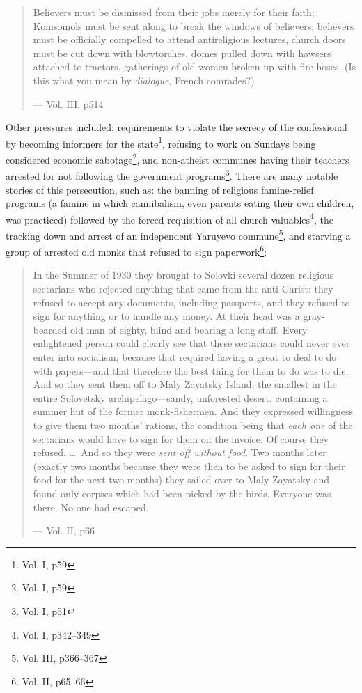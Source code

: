 \documentclass{article}
\begin{document}
\begin{quote}
Believers must be dismissed from their jobs merely for their faith; Komsomols must be sent along to break the windows of believers; believers must be officially compelled to attend antireligious lectures, church doors must be cut down with blowtorches, domes pulled down with hawsers attached to tractors, gatherings of old women broken up with fire hoses.  (Is this what you mean by \emph{dialogue}, French comrades?)

--- Vol. III, p514
\end{quote}

Other pressures included: requirements to violate the secrecy of the confessional by becoming informers for the state\footnote{Vol. I, p59}, refusing to work on Sundays being considered economic sabotage\footnote{Vol. I, p59}, and non-atheist communes having their teachers arrested for not following the government programs\footnote{Vol. I, p51}.  There are many notable stories of this persecution, such as: the banning of religious famine-relief programs (a famine in which cannibalism, even parents eating their own children, was practiced) followed by the forced requisition of all church valuables\footnote{Vol. I, p342--349}, the tracking down and arrest of an independent Yaruyevo commune\footnote{Vol. III, p366--367}, and starving a group of arrested old monks that refused to sign paperwork\footnote{Vol. II, p65--66}: 

\begin{quote}
In the Summer of 1930 they brought to Solovki several dozen religious sectarians who rejected anything that came from the anti-Christ: they refused to accept any documents, including passports, and they refused to sign for anything or to handle any money.  At their head was a gray-bearded old man of eighty, blind and bearing a long staff.  Every enlightened person could clearly see that these sectarians could never ever enter into socialism, because that required having a great to deal to do with papers---and that therefore the best thing for them to do was to die.  And so they sent them off to Maly Zayatsky Island, the smallest in the entire Solovetsky archipelago---sandy, unforested desert, containing a summer hut of the former monk-fishermen.  And they expressed willingness to give them two months' rations, the condition being that \emph{each one} of the sectarians would have to sign for them on the invoice.  Of course they refused. \ldots~And so they were \emph{sent off without food}.  Two months later (exactly two months because they were then to be asked to sign for their food for the next two months) they sailed over to Maly Zayatsky and found only corpses which had been picked by the birds.  Everyone was there.  No one had escaped.

--- Vol. II, p66
\end{quote}
\end{document}
